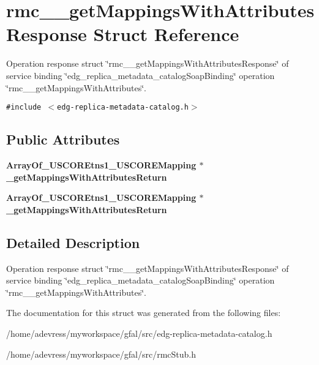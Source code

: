 \section{rmc\_\-\_\-get\-Mappings\-With\-Attributes\-Response Struct Reference}
\label{structrmc____getMappingsWithAttributesResponse}
Operation response struct \char`\"{}rmc\_\-\_\-get\-Mappings\-With\-Attributes\-Response\char`\"{} of service binding \char`\"{}edg\_\-replica\_\-metadata\_\-catalog\-Soap\-Binding\char`\"{} operation \char`\"{}rmc\_\-\_\-get\-Mappings\-With\-Attributes\char`\"{}.  


{\tt \#include $<$edg-replica-metadata-catalog.h$>$}

\subsection*{Public Attributes}
\begin{CompactItemize}
\item 
\bf{Array\-Of\_\-USCOREtns1\_\-USCOREMapping} $\ast$ \textbf{\_\-get\-Mappings\-With\-Attributes\-Return}\label{structrmc____getMappingsWithAttributesResponse_3a1b1de101f8e40222b084729419ab74}

\item 
\bf{Array\-Of\_\-USCOREtns1\_\-USCOREMapping} $\ast$ \textbf{\_\-get\-Mappings\-With\-Attributes\-Return}\label{structrmc____getMappingsWithAttributesResponse_3a1b1de101f8e40222b084729419ab74}

\end{CompactItemize}


\subsection{Detailed Description}
Operation response struct \char`\"{}rmc\_\-\_\-get\-Mappings\-With\-Attributes\-Response\char`\"{} of service binding \char`\"{}edg\_\-replica\_\-metadata\_\-catalog\-Soap\-Binding\char`\"{} operation \char`\"{}rmc\_\-\_\-get\-Mappings\-With\-Attributes\char`\"{}. 



The documentation for this struct was generated from the following files:\begin{CompactItemize}
\item 
/home/adevress/myworkspace/gfal/src/edg-replica-metadata-catalog.h\item 
/home/adevress/myworkspace/gfal/src/rmc\-Stub.h\end{CompactItemize}

